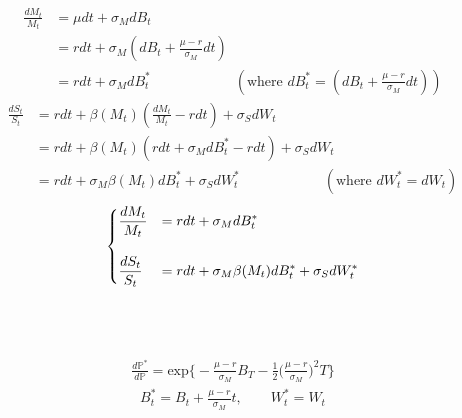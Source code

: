 \documentclass[12pt]{article}
\newenvironment{solution}[2][Solution]{\begin{trivlist}
\item[\hskip \labelsep {\bfseries #1}\hskip \labelsep {\bfseries #2.}]}{\end{trivlist}}
\newenvironment{question}[2][Question]{\begin{trivlist}
\item[\hskip \labelsep {\bfseries #1}\hskip \labelsep {\bfseries #2.}]}{\end{trivlist}}
\begin{document}
\newpage
\begin{question}{3}
\end{question}
\begin{solution}[Solution] \\ 
\begin{align*}
\frac{dM_t}{M_t} &= \mu dt + \sigma_M dB_t \\
&= rdt +\sigma_M \left( dB_t + \frac{\mu -r}{\sigma_M}dt \right)\\
&= rdt +\sigma_M dB_t^* \qquad \qquad \qquad \left(\text{where\ \ \ \ \ } dB_t^* = \left( dB_t + \frac{\mu -r}{\sigma_M}dt \right) \right)
\end{align*}
\begin{align*}
    \frac{dS_t}{S_t} &= rdt+ \beta(M_t) \left(\frac{dM_t}{M_t}-rdt\right) +\sigma_S dW_t\\
    &= rdt+ \beta(M_t) (rdt +\sigma_M dB_t^*-rdt) +\sigma_S dW_t\\
    &= rdt+ \sigma_M \beta(M_t) dB_t^*+\sigma_S dW_t^*  \qquad \qquad \qquad \left(\text{where\ \ \ \ \ } dW_t^* = dW_t \right)
\end{align*}
\begin{align*}
    \begin{dcases}
    \frac{dM_t}{M_t} &= rdt +\sigma_M dB_t^*\\[10pt]
    \frac{dS_t}{S_t} &= rdt+ \sigma_M \beta(M_t) dB_t^*+\sigma_S dW_t^*
    \end{dcases}
\end{align*}
\end{solution}

\ \\
\ \\
\begin{question}{4}
\end{question}
\begin{solution}[Solution] \\ 
\begin{align*}
    \frac{d\mathbb{P}^*}{d\mathbb{P}}= \text{exp}\bigg\{ -\frac{\mu-r}{\sigma_M}B_T -\frac{1}{2}\bigg( \frac{\mu-r}{\sigma_M} \bigg)^2 T \bigg\}
\end{align*}
\begin{align*}
    B^*_t = B_t + \frac{\mu-r}{\sigma_M}t,\qquad W^*_t = W_t
\end{align*}
\end{solution}
\end{document}
